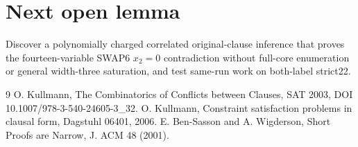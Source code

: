\documentclass{article}
\begin{document}
\section{Next open lemma}
Discover a polynomially charged correlated original-clause inference that proves the fourteen-variable SWAP6 $x_2=0$ contradiction without full-core enumeration or general width-three saturation, and test same-run work on both-label strict22.
\begin{thebibliography}{9}
 O. Kullmann, The Combinatorics of Conflicts between Clauses, SAT 2003, DOI 10.1007/978-3-540-24605-3\_32.
 O. Kullmann, Constraint satisfaction problems in clausal form, Dagstuhl 06401, 2006.
 E. Ben-Sasson and A. Wigderson, Short Proofs are Narrow, J. ACM 48 (2001).
\end{thebibliography}
\end{document}
